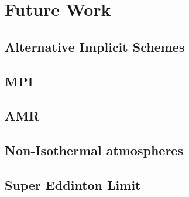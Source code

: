 \chapter{Future Work}

\section{Alternative Implicit Schemes}
\section{MPI}
\section{AMR}
\section{Non-Isothermal atmospheres}
\section{Super Eddinton Limit}